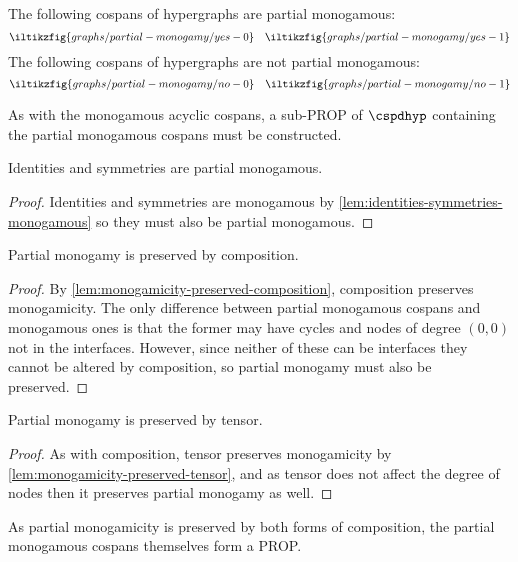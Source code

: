\begin{example}\label{ex:partial-monogamous}
    The following cospans of hypergraphs are partial monogamous:
    \[
        \iltikzfig{graphs/partial-monogamy/yes-0}
        \quad
        \iltikzfig{graphs/partial-monogamy/yes-1}
    \]
    The following cospans of hypergraphs are not partial monogamous:
    \[
        \iltikzfig{graphs/partial-monogamy/no-0}
        \quad
        \iltikzfig{graphs/partial-monogamy/no-1}
    \]
\end{example}

As with the monogamous acyclic cospans, a sub-PROP of \(\cspdhyp\) containing
the partial monogamous cospans must be constructed.

\begin{lemma}\label{lem:identities-symmetries-partial-monogamous}
    Identities and symmetries are partial monogamous.
\end{lemma}
\begin{proof}
    Identities and symmetries are monogamous by
    \cref{lem:identities-symmetries-monogamous} so they must also be partial
    monogamous.
\end{proof}

\begin{lemma}\label{lem:partial-monogamicity-preserved-composition}
    Partial monogamy is preserved by composition.
\end{lemma}
\begin{proof}
    By \cref{lem:monogamicity-preserved-composition}, composition preserves
    monogamicity.
    The only difference between partial monogamous cospans and monogamous ones
    is that the former may have cycles and nodes of degree \((0,0)\) not in the
    interfaces.
    However, since neither of these can be interfaces they cannot be altered by
    composition, so partial monogamy must also be preserved.
\end{proof}

\begin{lemma}\label{lem:partial-monogamicity-preserved-tensor}
    Partial monogamy is preserved by tensor.
\end{lemma}
\begin{proof}
    As with composition, tensor preserves monogamicity by
    \cref{lem:monogamicity-preserved-tensor}, and as tensor does not affect the
    degree of nodes then it preserves partial monogamy as well.
\end{proof}

As partial monogamicity is preserved by both forms of composition, the
partial monogamous cospans themselves form a PROP.

